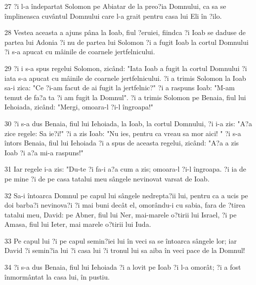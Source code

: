 \par 27 ?i l-a îndepartat Solomon pe Abiatar de la preo?ia Domnului, ca sa se împlineasca cuvântul Domnului care l-a grait pentru casa lui Eli în ?ilo.
\par 28 Vestea aceasta a ajuns pâna la Ioab, fiul ?eruiei, fiindca ?i Ioab se daduse de partea lui Adonia ?i nu de partea lui Solomon ?i a fugit Ioab la cortul Domnului ?i s-a apucat cu mâinile de coarnele jertfelnicului.
\par 29 ?i i s-a spus regelui Solomon, zicând: "Iata Ioab a fugit la cortul Domnului ?i iata s-a apucat cu mâinile de coarnele jertfelnicului. ?i a trimis Solomon la Ioab sa-i zica: "Ce ?i-am facut de ai fugit la jertfelnic?" ?i a raspuns Ioab: "M-am temut de fa?a ta ?i am fugit la Domnul". ?i a trimis Solomon pe Benaia, fiul lui Iehoiada, zicând: "Mergi, omoara-l ?i-l îngroapa!"
\par 30 ?i s-a dus Benaia, fiul lui Iehoiada, la Ioab, la cortul Domnului, ?i i-a zis: "A?a zice regele: Sa ie?i!" ?i a zis Ioab: "Nu ies, pentru ca vreau sa mor aici! " ?i s-a întors Benaia, fiul lui Iehoiada ?i a spus de aceasta regelui, zicând: "A?a a zis Ioab ?i a?a mi-a raspuns!"
\par 31 Iar regele i-a zis: "Du-te ?i fa-i a?a cum a zis; omoara-l ?i-l îngroapa. ?i ia de pe mine ?i de pe casa tatalui meu sângele nevinovat varsat de Ioab.
\par 32 Sa-i întoarca Domnul pe capul lui sângele nedrepta?ii lui, pentru ca a ucis pe doi barba?i nevinova?i ?i mai buni decât el, omorându-i cu sabia, fara de ?tirea tatalui meu, David: pe Abner, fiul lui Ner, mai-marele o?tirii lui Israel, ?i pe Amasa, fiul lui Ieter, mai marele o?tirii lui Iuda.
\par 33 Pe capul lui ?i pe capul semin?iei lui în veci sa se întoarca sângele lor; iar David ?i semin?ia lui ?i casa lui ?i tronul lui sa aiba în veci pace de la Domnul!
\par 34 ?i s-a dus Benaia, fiul lui Iehoiada ?i a lovit pe Ioab ?i l-a omorât; ?i a fost înmormântat la casa lui, în pustiu.
